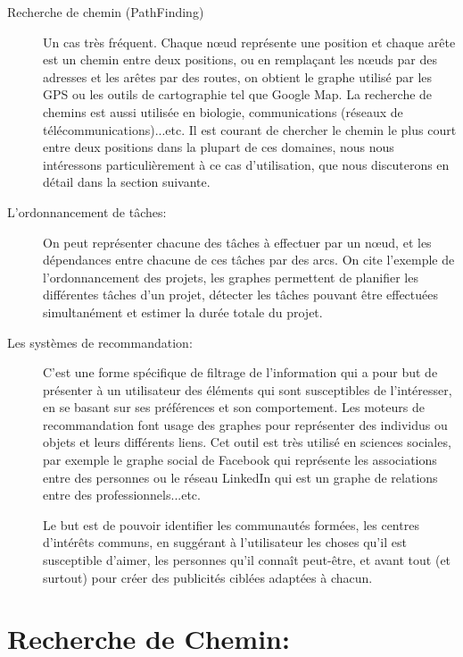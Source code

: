 \begin{description}


\item[Recherche de chemin (PathFinding)]
Un cas très fréquent. Chaque nœud représente une position et chaque arête est un chemin entre deux positions, ou en remplaçant les nœuds par des adresses et les arêtes par des routes, on obtient le graphe utilisé par les GPS ou les outils de cartographie tel que Google Map.
La recherche de chemins est aussi utilisée en biologie, communications (réseaux de télécommunications)...etc.
Il est courant de chercher le chemin le plus court entre deux positions dans la plupart de ces domaines, nous nous intéressons particulièrement à ce cas d'utilisation, que nous discuterons en détail dans la section suivante.


\item[L'ordonnancement de tâches:]
On peut représenter chacune des tâches à effectuer par un nœud, et les dépendances entre chacune de ces tâches par des arcs.
On cite l'exemple de l'ordonnancement des projets, les graphes permettent de planifier les différentes tâches d'un projet, détecter les tâches pouvant être effectuées simultanément et estimer la durée totale du projet.

\item[Les systèmes de recommandation:]
C'est une forme spécifique de filtrage de l'information qui a pour but de présenter à un utilisateur des éléments qui sont susceptibles de l'intéresser, en se basant sur ses préférences et son comportement.
Les moteurs de recommandation font usage des graphes pour représenter des individus ou objets et leurs différents liens. Cet outil est très utilisé en sciences sociales, par exemple le graphe social de Facebook qui représente les associations entre des personnes ou le réseau LinkedIn qui est un graphe de relations entre des professionnels...etc.

Le but est de pouvoir identifier les communautés formées, les centres d'intérêts communs, en suggérant à l'utilisateur les choses qu'il est susceptible d'aimer, les personnes qu'il connaît peut-être, et avant tout (et surtout) pour créer des publicités ciblées adaptées à chacun.

\end{description}

\section{Recherche de Chemin:}

